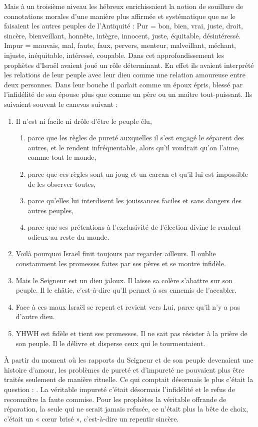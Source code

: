  Mais à un troisième niveau les hébreux enrichissaient la notion de souillure de connotations morales d'une manière plus affirmée et systématique que ne le faisaient les autres peuples de l'Antiquité : Pur = bon, bien, vrai, juste, droit, sincère, bienveillant, honnête, intègre, innocent, juste, équitable, désintéressé. Impur = mauvais, mal, faute, faux, pervers, menteur, malveillant, méchant, injuste, inéquitable, intéressé, coupable. Dans cet approfondissement les prophètes d'Israël avaient joué un rôle déterminant. En effet ils avaient interprété les relations de leur peuple avec leur dieu comme une relation amoureuse entre deux personnes. Dans leur bouche il parlait comme un époux épris, blessé par l'infidélité de son épouse plus que comme un père ou un maître tout-puissant. 
Ils suivaient souvent le canevas suivant :
\begin{enumerate}
\item Il n'est ni facile ni drôle d'être le peuple élu,
 \begin{enumerate}
 \item parce que les règles de pureté auxquelles il s'est engagé le séparent des autres, et le rendent infréquentable, alors qu'il voudrait qu'on l'aime, comme tout le monde,
 \item parce que ces règles sont un joug et un carcan et qu'il lui est impossible de les observer toutes,
 \item parce qu'elles lui interdisent les jouissances faciles et sans dangers des autres peuples,
 \item parce que ses prétentions à l'exclusivité de l'élection divine le rendent odieux au reste du monde. 
 \end{enumerate}
\item Voilà pourquoi Israël finit toujours par regarder ailleurs. Il oublie constamment les promesses faites par ses pères et se montre infidèle. 
\item Mais le Seigneur est un dieu jaloux. Il laisse sa colère s'abattre sur son peuple. Il le châtie, c'est-à-dire qu'Il permet à ses ennemis de l'accabler. 
\item Face à ces maux Israël se repent et revient vers Lui, parce qu'il n'y a pas d'autre dieu.
\item YHWH est fidèle et tient ses promesses. Il ne sait pas résister à la prière de son peuple. Il le délivre et disperse ceux qui le tourmentaient.
\end{enumerate}

 À partir du moment où les rapports du Seigneur et de son peuple devenaient une histoire d'amour, les problèmes de pureté et d'impureté ne pouvaient plus être traités seulement de manière rituelle. Ce qui comptait désormais le plus c'était la question : . 
La véritable impureté c'était désormais l'infidélité et le refus de reconnaître la faute commise. Pour les prophètes la véritable offrande de réparation, la seule qui ne serait jamais refusée, ce n'était plus la bête de choix, c'était un « cœur brisé », c'est-à-dire un repentir sincère. 

